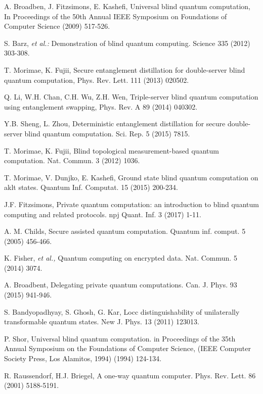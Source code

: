 \documentclass[aps,pra,showpacs,twocolumn,superscriptaddress]{revtex4-1}
\begin{document}
\vspace{5mm}
\begin{thebibliography}{10}
A. Broadben, J. Fitzsimons, E. Kashefi, Universal blind quantum computation, In Proceedings of the 50th Annual IEEE Symposium on Foundations of Computer Science (2009) 517-526.

S. Barz, \emph{et al.:} Demonstration of blind quantum computing. Science 335 (2012) 303-308.

T. Morimae, K. Fujii, Secure entanglement distillation for double-server blind quantum computation, Phys. Rev. Lett. 111 (2013) 020502.

Q. Li, W.H. Chan, C.H. Wu, Z.H. Wen, Triple-server blind quantum computation using entanglement swapping, Phys. Rev. A 89 (2014) 040302.

Y.B. Sheng, L. Zhou, Deterministic entanglement distillation for secure double-server blind quantum computation. Sci. Rep. 5 (2015) 7815.

T. Morimae, K. Fujii, Blind topological measurement-based quantum computation. Nat. Commun. 3 (2012) 1036.

T. Morimae, V. Dunjko, E. Kashefi, Ground state blind quantum computation on aklt states. Quantum Inf. Computat. 15 (2015) 200-234.

J.F. Fitzsimons, Private quantum computation: an introduction to blind quantum computing and related protocols. npj Quant. Inf. 3 (2017) 1-11.

A. M. Childs, Secure assisted quantum computation. Quantum inf. comput. 5 (2005) 456-466.

K. Fisher, \emph{et al.,} Quantum computing on encrypted data. Nat. Commun. 5 (2014) 3074.

A. Broadbent, Delegating private quantum computations. Can. J. Phys. 93 (2015) 941-946.

S. Bandyopadhyay, S. Ghosh, G. Kar, Locc distinguishability of unilaterally transformable quantum states. New J. Phys. 13 (2011) 123013.

P. Shor, Universal blind quantum computation. in Proceedings of the 35th Annual Symposium on the Foundations of Computer Science, (IEEE Computer Society Press, Los Alamitos, 1994) (1994) 124-134.

R. Raussendorf, H.J. Briegel, A one-way quantum computer. Phys. Rev. Lett. 86 (2001) 5188-5191.


\end{thebibliography}
\end{document}
